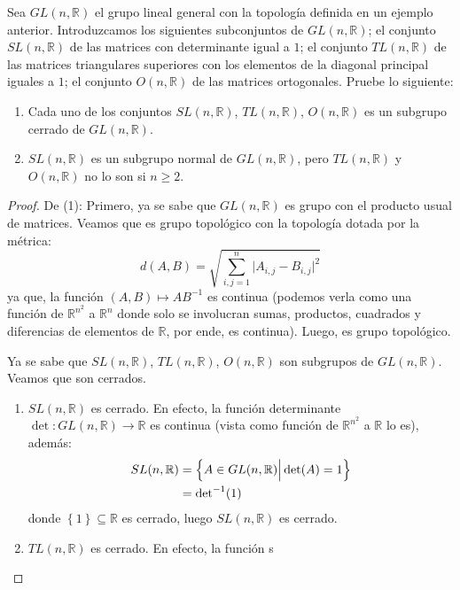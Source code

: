 \documentclass[12pt]{report}
\theoremstyle{largebreak}
\newcommand\abs[1]{\ensuremath{\lvert#1\rvert}}
\newcommand{\cf}[3]{\ensuremath{#1:#2\rightarrow#3}}
\begin{document}
    \begin{excer}
        Sea $GL(n,\mathbb{R})$ el grupo lineal general con la topología definida en un ejemplo anterior. Introduzcamos los siguientes subconjuntos de $GL(n,\mathbb{R})$; el conjunto $SL(n,\mathbb{R})$ de las matrices con determinante igual a $1$; el conjunto $TL(n,\mathbb{R})$ de las matrices triangulares superiores con los elementos de la diagonal principal iguales a $1$; el conjunto $O(n,\mathbb{R})$ de las matrices ortogonales. Pruebe lo siguiente:
        \begin{enumerate}
            \item Cada uno de los conjuntos $SL(n,\mathbb{R})$, $TL(n,\mathbb{R})$, $O(n,\mathbb{R})$ es un subgrupo cerrado de $GL(n,\mathbb{R})$.
            \item $SL(n,\mathbb{R})$ es un subgrupo normal de $GL(n,\mathbb{R})$, pero $TL(n,\mathbb{R})$ y $O(n,\mathbb{R})$ no lo son si $n\geq 2$.
        \end{enumerate}
    \end{excer}

    \begin{proof}
        De (1): Primero, ya se sabe que $GL(n,\mathbb{R})$ es grupo con el producto usual de matrices. Veamos que es grupo topológico con la topología dotada por la métrica:
        \begin{equation*}
            d(A,B)=\sqrt{\sum_{i,j=1}^n\abs{A_{i,j}-B_{i,j}}^2}
        \end{equation*}
        ya que, la función $(A,B)\mapsto AB^{-1}$ es continua (podemos verla como una función de $\mathbb{R}^{ n^2}$ a $\mathbb{R}^n$ donde solo se involucran sumas, productos, cuadrados y diferencias de elementos de $\mathbb{R}$, por ende, es continua). Luego, es grupo topológico.

        Ya se sabe que $SL(n,\mathbb{R})$, $TL(n,\mathbb{R})$, $O(n,\mathbb{R})$ son subgrupos de $GL(n,\mathbb{R})$. Veamos que son cerrados.
        \begin{enumerate}
            \item $SL(n,\mathbb{R})$ es cerrado. En efecto, la función determinante $\cf{\det}{GL(n,\mathbb{R})}{\mathbb{R}}$ es continua (vista como función de $\mathbb{R}^{ n^2}$ a $\mathbb{R}$ lo es), además:
            \begin{equation*}
                \begin{split}
                    SL(n,\mathbb{R})&=\left\{A\in GL(n,\mathbb{R})\Big|\det(A)=1 \right\}\\
                    &=\textup{det}^{-1}(1) \\
                \end{split}
            \end{equation*}
            donde $\left\{1\right\}\subseteq\mathbb{R}$ es cerrado, luego $SL(n,\mathbb{R})$ es cerrado.

            \item $TL(n,\mathbb{R})$ es cerrado. En efecto, la función s
        \end{enumerate}
    \end{proof}
\end{document}
